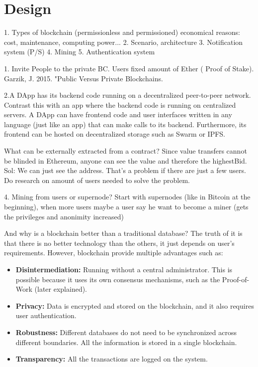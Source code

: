 \chapter{Design}
\label{ch:design}


1. Types of blockchain (permissionless and permissioned) economical reasons: cost, maintenance, computing power...
2. Scenario, architecture
3. Notification system (P/S)
4. Mining
5. Authentication system

1. Invite People to the private BC. Users fixed amount of Ether ( Proof of Stake). Garzik, J. 2015. "Public Versus Private Blockchains.

2.A DApp has its backend code running on a decentralized peer-to-peer network. Contrast this with an app where the backend code is running on centralized servers. A DApp can have frontend code and user interfaces written in any language (just like an app) that can make calls to its backend. Furthermore, its frontend can be hosted on decentralized storage such as Swarm or IPFS.

What can be externally extracted from a contract? Since value transfers cannot be blinded in Ethereum, anyone can see the value and therefore the highestBid. Sol: We can just see the address. That's a problem if there are just a few users. Do research on amount of users needed to solve the problem.

4. Mining from users or supernode? Start with supernodes (like in Bitcoin at the beginning), when more users maybe a user say he want to become a miner (gets the privileges and anonimity increased)

And why is a blockchain better than a traditional database? The truth of it is that there is no better technology than the others, it just depends on user's requirements. However, blockchain provide multiple advantages such as:
\begin{itemize}
	
	\item \textbf{Disintermediation:} Running without a central administrator. This is possible because it uses its own consensus mechanisms, such as the Proof-of-Work (later explained).  
	\item \textbf{Privacy:} Data is encrypted and stored on the blockchain, and it also requires user authentication.
	\item \textbf{Robustness:} Different databases do not need to be synchronized across different boundaries. All the information is stored in a single blockchain.
	\item \textbf{Transparency:} All the transactions are logged on the system.
\end{itemize}


